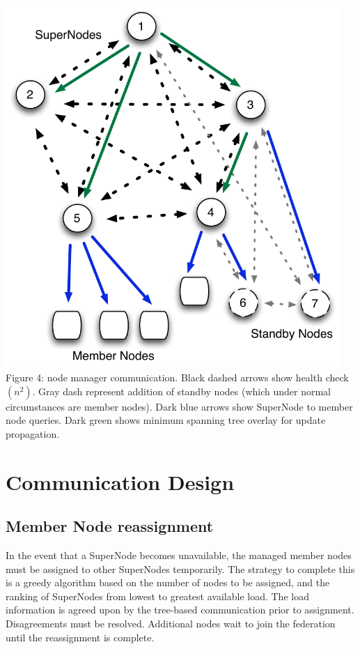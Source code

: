 \documentclass[oneside,12pt]{memoir}
\begin{document}
\begin{center}
\includegraphics[width=5in]{presentation/Node-comm-v3.pdf}\\
Figure 4: node manager communication.  Black dashed arrows show health check $(n^2)$.  Gray dash represent addition of standby nodes (which under normal circumstances are member nodes).  Dark blue arrows show SuperNode to member node queries.  Dark green shows minimum spanning tree overlay for update propagation.
\end{center}

\section{Communication Design}

\subsection{Member Node reassignment}

In the event that a SuperNode becomes unavailable, the managed member nodes must be assigned to other SuperNodes temporarily.  The strategy to complete this is a greedy algorithm based on the number of nodes to be assigned, and the ranking of SuperNodes from lowest to greatest available load.  The load information is agreed upon by the tree-based communication prior to assignment.  Disagreements must be resolved.  Additional nodes wait to join the federation until the reassignment is complete. 
\end{document}
